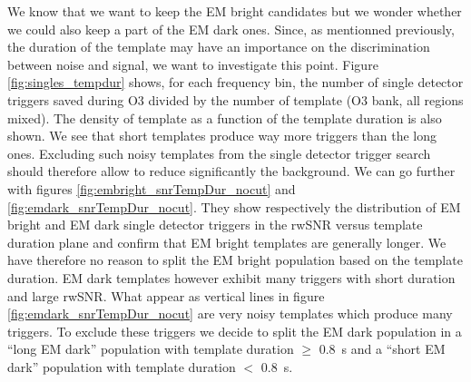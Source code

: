 

We know that we want to keep the EM bright candidates but we wonder whether we could also keep a part of the EM dark ones.
Since, as mentionned previously, the duration of the template may have an importance on the discrimination between noise and signal, we want to investigate this point.
Figure \ref{fig:singles_tempdur} shows, for each frequency bin, the number of single detector triggers saved during O3 divided by the number of template (O3 bank, all regions mixed).
The density of template as a function of the template duration is also shown.
We see that short templates produce way more triggers than the long ones.
Excluding such noisy templates from the single detector trigger search should therefore allow to reduce significantly the background.
We can go further with figures \ref{fig:embright_snrTempDur_nocut} and \ref{fig:emdark_snrTempDur_nocut}.
They show respectively the distribution of EM bright and EM dark single detector triggers in the rwSNR versus template duration plane and confirm that EM bright templates are generally longer.
We have therefore no reason to split the EM bright population based on the template duration.
EM dark templates however exhibit many triggers with short duration and large rwSNR.
What appear as vertical lines in figure \ref{fig:emdark_snrTempDur_nocut} are very noisy templates which produce many triggers.
To exclude these triggers we decide to split the EM dark population in a ``long EM dark'' population with template duration $\geq$ \SI{0.8}{s} and a ``short EM dark'' population with template duration $<$ \SI{0.8}{s}.


